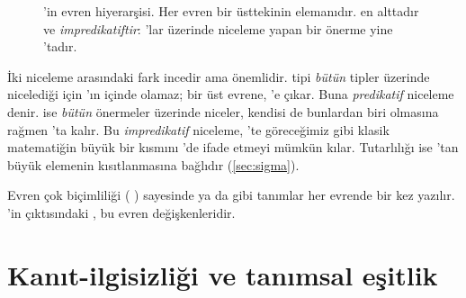 
\begin{figure}[htbp]
\centering
{}
\caption{\Lean{}'in evren hiyerarşisi. Her evren bir üsttekinin elemanıdır.
 en alttadır ve \emph{impredikatiftir}: 'lar üzerinde
niceleme yapan bir önerme yine 'tadır.}
\label{fig:evrenler}
\end{figure}

\noindent İki niceleme arasındaki fark incedir ama önemlidir.
 tipi \emph{bütün} tipler üzerinde nicelediği için
'ın içinde olamaz; bir üst evrene, 'e çıkar. Buna
\emph{predikatif} niceleme denir.  ise \emph{bütün}
önermeler üzerinde niceler, kendisi de bunlardan biri olmasına rağmen
'ta kalır. Bu \emph{impredikatif} niceleme, 'te göreceğimiz
gibi klasik matematiğin büyük bir kısmını \Lean{}'de ifade etmeyi mümkün
kılar. Tutarlılığı ise 'tan büyük elemenin kısıtlanmasına bağlıdır
(\cref{sec:sigma}).

\noindent Evren çok biçimliliği ( ) sayesinde
 ya da  gibi tanımlar her evrende bir kez yazılır.
'in çıktısındaki ,  bu evren
değişkenleridir.

\section{Kanıt-ilgisizliği ve tanımsal eşitlik}\label{sec:tanimsal}

